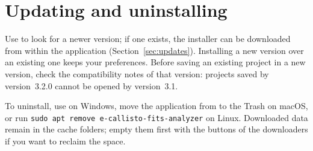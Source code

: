 \section{Updating and uninstalling}

Use  to look for a newer version; if one exists, the
installer can be downloaded from within the application (Section~\ref{sec:updates}).
Installing a new version over an existing one keeps your preferences. Before saving an
existing project in a new version, check the compatibility notes of that version: projects
saved by version~3.2.0 cannot be opened by version~3.1.

To uninstall, use  on Windows, move the application from
 to the Trash on macOS, or run
\texttt{sudo apt remove e-callisto-fits-analyzer} on Linux. Downloaded data remain in the
cache folders; empty them first with the  buttons of the downloaders if
you want to reclaim the space.
